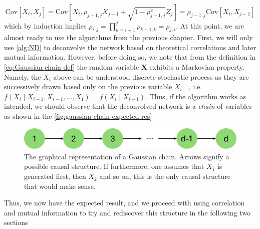 \documentclass[../Thesis.tex]{subfiles}
\begin{document}
$$\text{Cov}\left[X_i, X_j\right] = \text{Cov}\left[X_i, \rho_{j-1,j} X_{j-1} + \sqrt{1 - \rho_{j-1,j}^2}Z_j\right] = \rho_{j-1,j} \text{Cov}\left[X_i, X_{j-1}\right]$$
which by induction implies $\rho_{i,j} = \prod_{k=i+1}^{j} \rho_{k-1,k} = \rho_{j,i}$. At this point, we are almost ready to use the algorithms from the previous chapter. First, we will only use \autoref{alg:ND} to deconvolve the network based on theoretical correlations and later mutual information. However, before doing so, we note that from the definition in \autoref{eq:Gaussian chain def} the random variable $\boldsymbol X$ exhibits a Markovian property. Namely, the $X_i$ above can be understood discrete stochastic process as they are successively drawn based only on the previous variable $X_{i-1}$ i.e. $f\left(X_i \mid X_{i-1}, X_{i-1} , \dots , X_{1}\right) = f\left(X_i \mid X_{i-1}\right)$. Thus, if the algorithm works as intended, we should observe that the deconvolved network is a \textit{chain} of variables as shown in the \autoref{fig:gaussian chain expected res}
\begin{figure}[h]
    \centering
    \includegraphics[width = .7\linewidth]{figures/ND examples/Gaussian chain.png}
    \caption{The graphical representation of a Gaussian chain. Arrows signify a possible causal structure. If furthermore, one assumes that $X_1$ is generated first, then $X_2$ and so on, this is the only causal structure that would make sense.}
    \label{fig:gaussian chain expected res}
\end{figure}
Thus, we now have the expected result, and we proceed with using correlation and mutual information to try and rediscover this structure in the following two sections
\end{document}
